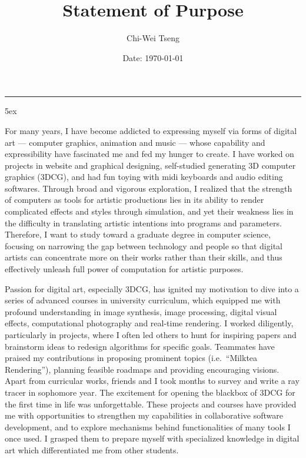 \documentclass[a4paper, 12pt]{article}
\title{Statement of Purpose}
\author{Chi-Wei Tseng}
\date{Date: \today}
\makeatletter
\newcommand{\HRule}{\rule{\linewidth}{0.2mm}}
\renewcommand{\maketitle}{
  \parindent=0pt%
  \begin{flushleft}
  \bf \large{\@author}
  \HRule
  \end{flushleft}
  \begin{center}
    \MakeUppercase{\bf \@title}
  \end{center}%
    \par
}
\makeatother
\begin{document}
{\linespread{0.8} \maketitle}
\parindent 5ex

For many years, I have become addicted to expressing myself via forms of digital art --- computer graphics, animation and music --- whose capability and expressibility have fascinated me and fed my hunger to create. I have worked on projects in website and graphical designing, self-studied generating 3D computer graphics (3DCG), and had fun toying with midi keyboards and audio editing softwares. Through broad and vigorous exploration, I realized that the strength of computers as tools for artistic productions lies in its ability to render complicated effects and styles through simulation, and yet their weakness lies in the difficulty in translating artistic intentions into programs and parameters. Therefore, I want to study toward a graduate degree in computer science, focusing on narrowing the gap between technology and people so that digital artists can concentrate more on their works rather than their skills, and thus effectively unleash full power of computation for artistic purposes.

Passion for digital art, especially 3DCG, has ignited my motivation to dive into a series of advanced courses in university curriculum, which equipped me with profound understanding in image synthesis, image processing, digital visual effects, computational photography and real-time rendering. I worked diligently, particularly in projects, where I often led others to hunt for inspiring papers and brainstorm ideas to redesign algorithms for specific goals. Teammates have praised my contributions in proposing prominent topics (i.e.\ ``Milktea Rendering''), planning feasible roadmaps and providing encouraging visions. Apart from curricular works, friends and I took months to survey and write a ray tracer in sophomore year. The excitement for opening the blackbox of 3DCG for the first time in life was unforgettable. These projects and courses have provided me with opportunities to strengthen my capabilities in collaborative software development, and to explore mechanisms behind functionalities of many tools I once used. I grasped them to prepare myself with specialized knowledge in digital art which differentiated me from other students.

\end{document}

